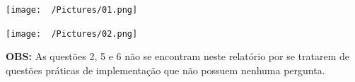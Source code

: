 \documentclass[12pt,a4paper]{article}
\begin{document}
\begin{enumerate}
			\texttt{[image: ~/Pictures/01.png]}
			
			\texttt{[image: ~/Pictures/02.png]}
		\end{enumerate}
		
		\textbf{OBS:} As questões 2, 5 e 6 não se encontram neste relatório por se tratarem de questões práticas de implementação que não possuem nenhuma pergunta.
\end{document}

